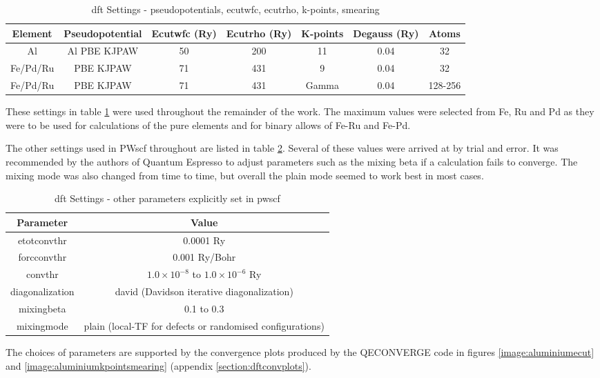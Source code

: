 \begin{table}[h]
\begin{center}
\renewcommand{\arraystretch}{1.2}
\begin{tabular}{c c c c c c c}
\hline\hline
Element & Pseudopotential & Ecutwfc (Ry) & Ecutrho (Ry) & K-points & Degauss (Ry) & Atoms\\
\hline\hline
Al & Al PBE KJPAW & 50 & 200 & 11 & 0.04 & 32\\
Fe/Pd/Ru & PBE KJPAW & 71 & 431 & 9 & 0.04 & 32 \\ 
Fe/Pd/Ru & PBE KJPAW & 71 & 431 & Gamma & 0.04 & 128-256 \\ 
\hline\hline
\end{tabular}
\end{center}
\caption{\acrshort{dft} Settings - pseudopotentials, ecutwfc, ecutrho, k-points, smearing}
\label{table:dftsettingsa}
\end{table}
\FloatBarrier

These settings in table \ref{table:dftsettingsa} were used throughout the remainder of the work.  The maximum values were selected from Fe, Ru and Pd as they were to be used for calculations of the pure elements and for binary allows of Fe-Ru and Fe-Pd.

The other settings used in PWscf throughout are listed in table \ref{table:dftsettingsb}.  Several of these values were arrived at by trial and error.  It was recommended by the authors of Quantum Espresso to adjust parameters such as the mixing beta if a calculation fails to converge.  The mixing mode was also changed from time to time, but overall the plain mode seemed to work best in most cases.

\begin{table}[h]
\begin{center}
\renewcommand{\arraystretch}{1.2}
\begin{tabular}{c c}
\hline\hline
Parameter & Value \\
\hline\hline
\gls{etotconvthr} & 0.0001 Ry \\
\gls{forcconvthr} & 0.001 Ry/Bohr \\ 
\gls{convthr} & $1.0 \times 10^{-8}$ to $1.0 \times 10^{-6}$ Ry \\ 
\gls{diagonalization} & david (Davidson iterative diagonalization) \\ 
\gls{mixingbeta} & 0.1 to 0.3 \\ 
\gls{mixingmode} & plain (local-TF for defects or randomised configurations) \\ 
\hline\hline
\end{tabular}
\end{center}
\caption{\acrshort{dft} Settings - other parameters explicitly set in \acrshort{pwscf}}
\label{table:dftsettingsb}
\end{table}

\FloatBarrier

The choices of parameters are supported by the convergence plots produced by the QECONVERGE code in figures \ref{image:aluminiumecut} and \ref{image:aluminiumkpointsmearing} (appendix \ref{section:dftconvplots}).


